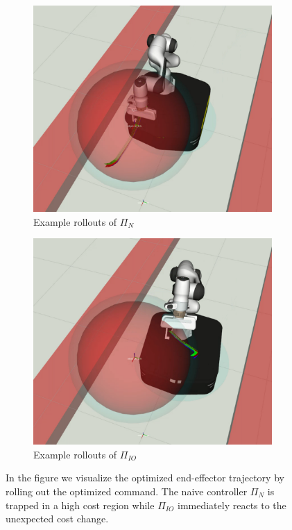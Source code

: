 \begin{figure}[t]
\centering
\begin{subfigure}{0.48\columnwidth}
    \includegraphics[width=\linewidth]{figures/obstacle_avoidance/rollouts_no_filter.pdf}
    \caption{Example rollouts of $\Pi_{N}$}
\end{subfigure}%
\hfill
\begin{subfigure}{0.48\columnwidth}
    \includegraphics[width=\linewidth]{figures/obstacle_avoidance/rollouts_filter.pdf}
    \caption{Example rollouts of $\Pi_{IO}$}
\end{subfigure}%
\hfill
\caption{In the figure we visualize the optimized end-effector trajectory by rolling out the optimized command. The naive controller $\Pi_{N}$ is trapped in a high cost region while $\Pi_{IO}$ immediately reacts to the unexpected cost change.}\label{fig:rollouts_comparison}
\end{figure}

